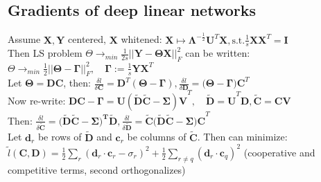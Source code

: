 \subsection*{Gradients of deep linear networks}
Assume $\mathbf{X,Y}$ centered, $\mathbf X$ whitened: $\mathbf X\mapsto \mathbf{\Lambda}^{-\frac{1}{2}}\mathbf U^T\mathbf X, \text{s.t.} \frac{1}{s}\mathbf{XX}^T=\mathbf I$ \\
Then LS problem $\Theta\rightarrow_{min}\frac{1}{2s}||\mathbf{\mathbf Y-\Theta\mathbf X}||^2_F$ can be written:\\ $\Theta\rightarrow_{min}\frac{1}{2}||\mathbf{\Theta-\Gamma}||^2_F, \quad \mathbf{\Gamma:=}\frac{1}{s}\mathbf{YX}^T$\\
Let $\mathbf{\Theta=DC}$, then: $\frac{\delta l}{\delta \mathbf C}=\mathbf D^T(\mathbf{\Theta-\Gamma}), \frac{\delta l}{\delta\mathbf D}=(\mathbf{\Theta-\Gamma)C}^T$\\
Now re-write: $\mathbf{DC-\Gamma=U(\tilde{D}\tilde{C}-\Sigma)V}^T, \quad \mathbf{\tilde{D}=U}^T\mathbf D, \mathbf{\tilde{C}=CV}$\\
Then: $\frac{\delta l}{\delta \mathbf{\tilde{C}}}=\mathbf (\mathbf{\tilde{D}\tilde C-\Sigma)^T\tilde D}, \frac{\delta l}{\delta\mathbf{\tilde{D}}}=\mathbf{\tilde C}(\mathbf{\tilde D \tilde C-\Sigma)C}^T$\\
Let $\mathbf d_r$ be rows of $\mathbf{\tilde D}$ and $\mathbf c_r$ be columns of $\mathbf{\tilde C}$. Then can minimize:\\
$\tilde l(\mathbf{C,D})=\frac{1}{2}\sum_{r}(\mathbf d_r\cdot\mathbf c_r-\sigma_r)^2+\frac{1}{2}\sum_{r\neq q}(\mathbf d_r\cdot \mathbf c_q)^2$ (cooperative and competitive terms, second orthogonalizes)



